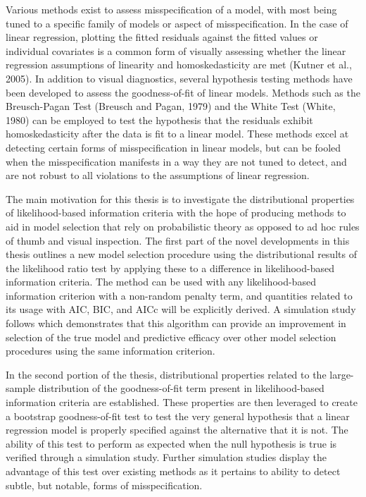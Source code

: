 		Various methods exist to assess misspecification of a model, with most being tuned to a specific family of models or aspect of misspecification. In the case of linear regression,
		plotting the fitted residuals against the fitted values or individual covariates is a common form of visually assessing whether the linear regression assumptions of linearity and
		homoskedasticity are met (Kutner et al., 2005). In addition to visual diagnostics, several hypothesis testing methods have been developed to assess the goodness-of-fit of linear
		models. Methods such as the Breusch-Pagan Test (Breusch and Pagan, 1979) and the White Test (White, 1980) can be employed to test the hypothesis that the residuals exhibit homoskedasticity
		after the data is fit to a linear model. These methods excel at detecting certain forms of misspecification in linear models, but can be fooled when the misspecification manifests in a
		way they are not tuned to detect, and are not robust to all violations to the assumptions of linear regression.

		The main motivation for this thesis is to investigate the distributional properties of likelihood-based information criteria with the hope of producing methods to aid in model selection
		that rely on probabilistic theory as opposed to ad hoc rules of thumb and visual inspection. The first part of the novel developments in this thesis outlines a new model selection procedure using the distributional
		results of the likelihood ratio test by applying these to a difference in likelihood-based information criteria. The method can be used with any likelihood-based information criterion
		with a non-random penalty term, and quantities related to its usage with AIC, BIC, and AICc will be explicitly derived. A simulation study follows which demonstrates that this algorithm
		can provide an improvement in selection of the true model and predictive efficacy over other model selection procedures using the same information criterion.
		
		In the second portion of the thesis, distributional properties related to the large-sample distribution of the goodness-of-fit term present in likelihood-based information criteria
		are established. These properties are then leveraged to create a bootstrap goodness-of-fit test to test the very general hypothesis that a linear regression model is properly specified
		against the alternative that it is not. The ability of this test to perform as expected when the null hypothesis is true is verified through a simulation study. Further simulation
		studies display the advantage of this test over existing methods as it pertains to ability to detect subtle, but notable, forms of misspecification.

